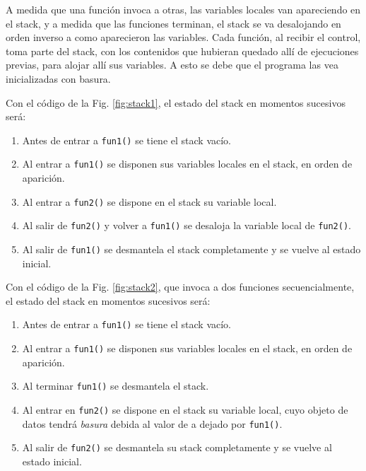 A medida que una función invoca a otras, las variables locales van apareciendo en el stack, y a medida
que las funciones terminan, el stack se va desalojando en orden inverso a como aparecieron las
variables. Cada función, al recibir el control, toma parte del stack, con los contenidos que hubieran
quedado allí de ejecuciones previas, para alojar allí sus variables. A esto se debe que el programa las
vea inicializadas con basura.


\begin{ejemplo}
Con el código de la Fig. \ref{fig:stack1}, el estado del stack en momentos sucesivos será: 
\begin{enumerate}
\item Antes de entrar a \texttt{fun1()} se tiene el stack vacío.
\item Al entrar a \texttt{fun1()} se disponen sus variables locales en el stack, en orden de aparición.
\item Al entrar a \texttt{fun2()} se dispone en el stack su variable local.
\item Al salir de \texttt{fun2()} y volver a \texttt{fun1()} se desaloja la variable local de \texttt{fun2()}.
\item Al salir de \texttt{fun1()} se desmantela el stack completamente y se vuelve al estado inicial.
\end{enumerate}
\end{ejemplo}

\begin{ejemplo}
Con el código de la Fig. \ref{fig:stack2}, que invoca a dos funciones secuencialmente, el estado del stack en momentos sucesivos será: 
\begin{enumerate}
\item Antes de entrar a \texttt{fun1()} se tiene el stack vacío.
\item Al entrar a \texttt{fun1()} se disponen sus variables locales en el stack, en orden de aparición.
\item Al terminar \texttt{fun1()} se desmantela el stack.
\item Al entrar en \texttt{fun2()} se dispone en el stack su variable local, cuyo objeto de datos tendrá \textit{basura} debida al valor de a dejado por \texttt{fun1()}.
\item Al salir de \texttt{fun2()} se desmantela su stack completamente y se vuelve al estado inicial.
\end{enumerate}
\end{ejemplo}

